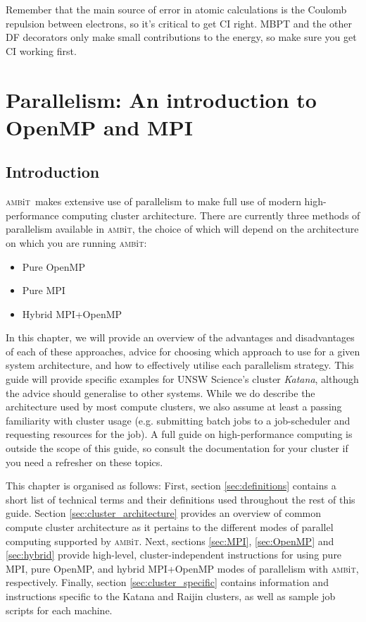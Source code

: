 \documentclass{report}
\newcommand{\ambit}{\textsc{amb}{\footnotesize i}\textsc{t}}
\begin{document}
Remember that the main source of error in atomic calculations is the Coulomb repulsion between
electrons, so it's critical to get CI right. MBPT and the other DF decorators only make small 
contributions to the energy, so make sure you get CI working first.


\chapter{Parallelism: An introduction to OpenMP and MPI}
\label{chap:HPC}

\section{Introduction}
\ambit\ makes extensive use of parallelism to make full use of modern high-performance computing cluster
architecture. There are currently three methods of parallelism available in \ambit, the choice of which
will depend on the architecture on which you are running \ambit:

\begin{itemize}
    \item Pure OpenMP
    \item Pure MPI
    \item Hybrid MPI+OpenMP
\end{itemize}

In this chapter, we will provide an overview of the advantages and disadvantages of each of these
approaches, advice for choosing which approach to use for a given system architecture, and how to
effectively utilise each parallelism strategy. This guide will provide specific examples for UNSW 
Science's cluster \textit{Katana}, although the advice should generalise to other systems. While we do
describe the architecture used by most compute clusters, we also assume at least a passing familiarity
with cluster usage (e.g. submitting batch jobs to a job-scheduler and requesting resources for the job).
A full guide on high-performance computing is outside the scope of this guide, so consult the
documentation for your cluster if you need a refresher on these topics.

This chapter is organised as follows:
First, section \ref{sec:definitions} contains a short list of technical terms and their definitions used
throughout the rest of this guide. Section \ref{sec:cluster_architecture} provides an overview of common
compute cluster architecture as it pertains to the different modes of parallel computing supported by
\ambit. Next, sections \ref{sec:MPI}, \ref{sec:OpenMP} and \ref{sec:hybrid} provide high-level,
cluster-independent instructions for using pure MPI, pure OpenMP, and hybrid MPI+OpenMP modes of 
parallelism with \ambit, respectively. Finally, section \ref{sec:cluster_specific} contains information
and instructions specific to the Katana and Raijin clusters, as well as sample job scripts for each
machine.
\end{document}
